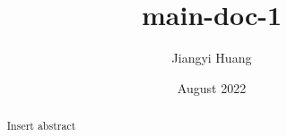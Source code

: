 \documentclass{article}
\title{main-doc-1}
\author{Jiangyi Huang}
\date{August 2022}
\begin{document}


\maketitle

\begin{abstract}
Insert abstract
\end{abstract}



\newpage


\end{document}
